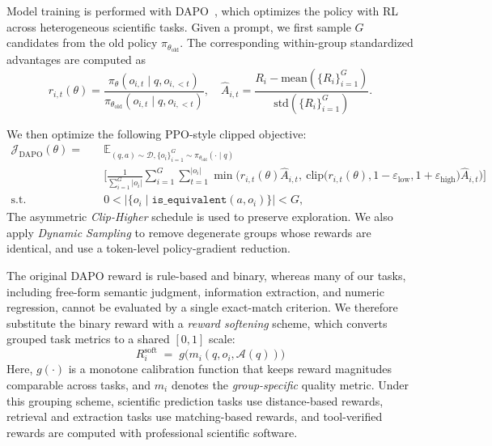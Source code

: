 Model training is performed with DAPO~\citep{yu2026dapo}, which optimizes the policy with RL across heterogeneous scientific tasks. Given a prompt, we first sample \(G\) candidates from the old policy \(\pi_{\theta_{\text{old}}}\). The corresponding within-group standardized advantages are computed as
\begin{equation}
  r_{i,t}(\theta)=\frac{\pi_{\theta}(o_{i,t} \mid q, o_{i,<t})}{\pi_{\theta_{\text{old}}}(o_{i,t} \mid
  q,o_{i,<t})},\quad
  \hat{A}_{i,t} = \frac{R_i - \text{mean}(\{R_i\}_{i=1}^G)}{\text{std}(\{R_i\}_{i=1}^G)}.
\label{eq:advantage_calculation}
\end{equation}

We then optimize the following PPO-style clipped objective:
\begin{equation}
\begin{aligned}
\mathcal{J}_{\text{DAPO}}(\theta) =\quad& \mathbb{E}_{(q,a)\sim \mathcal{D}, \{o_i\}_{i=1}^G\sim
\pi_{\theta_\text{old}}(\cdot\mid q)}\\&
\Bigg[\frac{1}{\sum_{i=1}^{G}|o_i|}\sum_{i=1}^{G}\sum_{t=1}^{|o_i|}
\min \Big( r_{i,t}(\theta) \hat{A}_{i,t},
\ \text{clip} \Big( r_{i,t}(\theta), 1 - {\varepsilon_{\text{low}}}, 1 + {\varepsilon_{\text{high}}}
\Big) \hat{A}_{i,t} \Big) \Bigg]
\\
\text{s.t.}\quad& 0< \Big|\{o_i\mid\texttt{is\_equivalent}(a,o_i)\}\Big|< G,
\end{aligned}
\label{eq:dapoloss}
\end{equation}
The asymmetric \emph{Clip-Higher} schedule is used to preserve exploration. We also apply \emph{Dynamic Sampling} to remove degenerate groups whose rewards are identical, and use a token-level policy-gradient reduction.

The original DAPO reward is rule-based and binary, whereas many of our tasks, including free-form semantic judgment, information extraction, and numeric regression, cannot be evaluated by a single exact-match criterion. We therefore substitute the binary reward with a \emph{reward softening} scheme, which converts grouped task metrics to a shared \([0,1]\) scale: 
\begin{equation}
\label{eq:task_aware_soft_reward}
R_i^{\text{soft}}
\;=\;
g\!\big(m_i(q,o_i,\mathcal{A}(q))\big)
\end{equation}
Here, \(g(\cdot)\) is a monotone calibration function that keeps reward magnitudes comparable across tasks, and \(m_i\) denotes the \emph{group-specific} quality metric. Under this grouping scheme, scientific prediction tasks use distance-based rewards, retrieval and extraction tasks use matching-based rewards, and tool-verified rewards are computed with professional scientific software.


